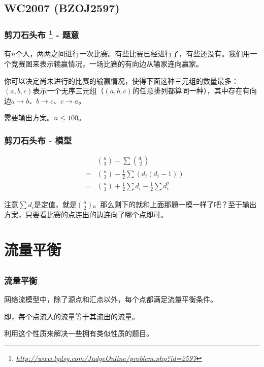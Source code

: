 \documentclass[9pt,dvipsnames,table]{beamer}
\newcommand{\hlink}[1]{
	\footnote{\fontsize{6pt}{\baselineskip}\href{#1}{\textsl{\underline{#1}}}}
}
\begin{document}
\subsection{WC2007 (BZOJ2597)}
\begin{frame}
	\frametitle{剪刀石头布\hlink{http://www.lydsy.com/JudgeOnline/problem.php?id=2597} - 题意}
	有$n$个人，两两之间进行一次比赛。有些比赛已经进行了，有些还没有。我们用一个竞赛图来表示输赢情况，一场比赛的有向边从输家连向赢家。
	
	你可以决定尚未进行的比赛的输赢情况，使得下面这种三元组的数量最多：$(a,b,c)$表示一个无序三元组（$(a,b,c)$的任意排列都算同一种），其中存在有向边$a\rightarrow b$、$b\rightarrow c$、$c\rightarrow a$。
	
	需要输出方案。$n\leq 100$。
\end{frame}
\begin{frame}
	\frametitle{剪刀石头布 - 模型}
	\begin{eqnarray*}
		 & & \binom{n}{3}-\sum\binom{d_i}{2} \\
		 & = & \binom{n}{3}-\frac{1}{2}\sum(d_i(d_i-1)) \\
		 & = & \binom{n}{3}+\frac{1}{2}\sum{d_i}-\frac{1}{2}\sum{d_i^2}
	\end{eqnarray*}\pause
	
	注意$\sum{d_i}$是定值，就是$\binom{n}{2}$。那么剩下的就和上面那题一模一样了吧？至于输出方案，只要看比赛的点连出的边连向了哪个点即可。
\end{frame}

\section[Model VI]{流量平衡}
\subsection{}
\begin{frame}
	\frametitle{流量平衡}
	网络流模型中，除了源点和汇点以外，每个点都满足流量平衡条件。
	
	即，每个点流入的流量等于其流出的流量。
	
	利用这个性质来解决一些拥有类似性质的题目。
\end{frame}
\end{document}
